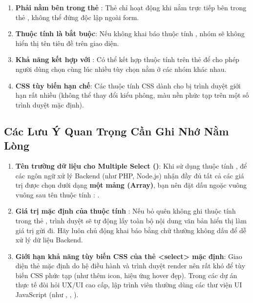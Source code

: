 \begin{warnBox}
\begin{enumerate}[leftmargin=1.5em, itemsep=4pt, parsep=0pt]
    \item \textbf{Phải nằm bên trong thẻ }: Thẻ  chỉ hoạt động khi nằm trực tiếp bên trong thẻ , không thể đứng độc lập ngoài form.
    \item \textbf{Thuộc tính  là bắt buộc}: Nếu không khai báo thuộc tính , nhóm sẽ không hiển thị tên tiêu đề trên giao diện.
    \item \textbf{Khả năng kết hợp với }: Có thể kết hợp thuộc tính  trên thẻ  để cho phép người dùng chọn cùng lúc nhiều tùy chọn nằm ở các nhóm khác nhau.
    \item \textbf{CSS tùy biến hạn chế}: Các thuộc tính CSS dành cho  bị trình duyệt giới hạn rất nhiều (không thể thay đổi kiểu phông, màu nền phức tạp trên một số trình duyệt mặc định).
\end{enumerate}
\end{warnBox}

\subsection{Các Lưu Ý Quan Trọng Cần Ghi Nhớ Nằm Lòng}

\begin{warnBox}
\begin{enumerate}[leftmargin=1.5em, itemsep=6pt, parsep=0pt]
    \item \textbf{Tên trường dữ liệu cho Multiple Select ()}:
    Khi sử dụng thuộc tính , để các ngôn ngữ xử lý Backend (như PHP, Node.js) nhận đầy đủ tất cả các giá trị được chọn dưới dạng \textbf{một mảng (Array)}, bạn nên đặt dấu ngoặc vuông vuông sau tên thuộc tính : .

    \item \textbf{Giá trị mặc định của thuộc tính }:
    Nếu bỏ quên không ghi thuộc tính  trong thẻ , trình duyệt sẽ tự động lấy toàn bộ nội dung văn bản hiển thị làm giá trị gửi đi. Hãy luôn chủ động khai báo  bằng chữ thường không dấu để dễ xử lý dữ liệu Backend.

    \item \textbf{Giới hạn khả năng tùy biến CSS của thẻ <select> mặc định}:
    Giao diện thẻ  mặc định do hệ điều hành và trình duyệt render nên rất khó để tùy biến CSS phức tạp (như thêm icon, hiệu ứng hover đẹp). Trong các dự án thực tế đòi hỏi UX/UI cao cấp, lập trình viên thường dùng các thư viện UI JavaScript (như , , ).
\end{enumerate}
\end{warnBox}


